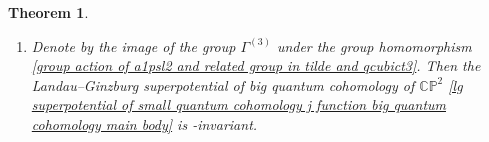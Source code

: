 \documentclass[pdftex]{sigma}
\numberwithin{equation}{section}
\newtheorem{Theorem}{Theorem}[section]
\begin{document}
\begin{Theorem}
\begin{enumerate}
The coefficients  belong to the following ring
.

 In addition, the correspondent Abelian differential $\phi$ is given by
\begin{gather}\label{volume form of Big quantum cohomology 1 Milanov deformation section}
\phi=-\frac{2^{\frac{5}{2}}}{2\pi}\frac{\Delta^{\frac{1}{6}}\bigl(\tilde\tau_{12}, Q^{\frac{1}{3}}t^3 \bigr)}{Q^{\frac{1}{6}}}{\rm d}\tilde\tau_{12},
\end{gather}
where $\Delta\bigl(\tilde\tau_{12}, Q^{\frac{1}{3}}t^3 \bigr)$ is defined in \eqref{modular deformation tilde 0}.

\item[$(2)$]
Denote by  the image of the group $\Gamma^{(3)}$ under the group homomorphism \eqref{group action of a1psl2 and related group in tilde and qcubict3}. Then the Landau--Ginzburg superpotential of big quantum cohomology of $\mathbb{CP}^2$ \eqref{lg superpotential of small quantum cohomology j function big quantum cohomology main body} is -invariant.
\end{enumerate}

\end{Theorem}
\end{document}
